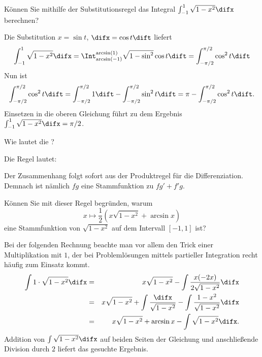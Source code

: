 \begin{frage}\label{06_sbsp}
Können Sie mithilfe der Substitutionsregel das Integral 
$\int_{-1}^1 \sqrt{1-x^2} \difx$ berechnen?
\end{frage}

\begin{antwort}
Die Substitution $x = \sin t$, $\difx =\cos t \dift$ liefert  
\[
\int_{-1}^1 \sqrt{1-x^2}\difx = 
\Int_{\arcsin(-1)}^{\arcsin (1)} 
\sqrt{1-\sin^2}\cos t \dift 
= \int_{-\pi/2}^{\pi/2} \cos^2 t \dift 
\]
Nun ist
\[
\int_{-\pi/2}^{\pi/2}\cos^2 t  \dift = 
\int_{-\pi/2}^{\pi/2} 1 \dift - 
\int_{-\pi/2}^{\pi/2} \sin^2 t \dift = 
\pi - \int_{-\pi/2}^{\pi/2} \cos^2 t \dift.
\]
Einsetzen in die oberen Gleichung führt zu dem Ergebnis 
$\int_{-1}^1 \sqrt{1-x^2}\difx = \pi/2$. \AntEnd
\end{antwort}



\begin{frage}
Wie lautet die ?
\end{frage}   



\begin{antwort}
Die Regel lautet: 

\medskip\noindent
Der Zusammenhang folgt sofort aus der Produktregel 
für die Differenziation. 
Demnach ist nämlich $fg$ eine Stammfunktion zu 
$fg'+f'g$. 
\AntEnd
\end{antwort}

\begin{frage}\label{06_inberechnung}
Können Sie mit dieser Regel begründen, warum 
\[
x\mapsto \frac{1}{2} ( x\sqrt{1-x^2} + \arcsin x )
\]
eine Stammfunktion von $\sqrt{1-x^2}$ auf dem Intervall 
$[-1,1]$ ist? 
\end{frage}

\begin{antwort}
Bei der folgenden Rechnung beachte man vor allem den Trick 
einer Multiplikation mit $1$, der bei Problemlösungen 
mittels partieller Integration recht häufig zum Einsatz kommt. 
\begin{eqnarray*}
\int 1\cdot \sqrt{1-x^2}\difx &=& 
x \sqrt{1-x^2} - \int \frac{x(-2x)}{2\sqrt{1-x^2}} \difx \\
&=& x\sqrt{1-x^2} + \int \frac{\difx}{\sqrt{1-x^2}} - 
\int \frac{1-x^2}{\sqrt{1-x^2}}\difx \\
&=& 
x\sqrt{1-x^2} + \arcsin x - \int \sqrt{1-x^2}\difx.
\end{eqnarray*}
Addition von $\int \sqrt{1-x^2}\difx$ auf beiden Seiten 
der Gleichung und anschließende Division durch $2$ 
liefert das gesuchte Ergebnis. \AntEnd
\end{antwort}

